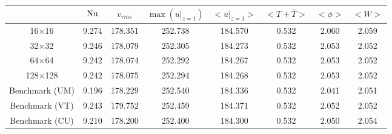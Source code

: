 \begin{tabular}{c|ccccccc}
    & $\mathrm{Nu}$ & $v_{rms}$ & $\max(u|_{z=1})$ & $<u|_{z=1}>$ & $<T + \bar{T}>$ & $<\phi>$ & $<W>$ \\
\hline
16$\times$16 & 9.274 & 178.351 & 252.738 & 184.570 & 0.532 & 2.060 & 2.059 \\
32$\times$32 & 9.246 & 178.079 & 252.305 & 184.273 & 0.532 & 2.053 & 2.052 \\
64$\times$64 & 9.242 & 178.074 & 252.292 & 184.267 & 0.532 & 2.053 & 2.052 \\
128$\times$128 & 9.242 & 178.075 & 252.294 & 184.268 & 0.532 & 2.053 & 2.052 \\
\hline
Benchmark (UM) & 9.196 & 178.229 & 252.540 & 184.336 & 0.532 & 2.041 & 2.051 \\
Benchmark (VT) & 9.243 & 179.752 & 252.459 & 184.371 & 0.532 & 2.052 & 2.052 \\
Benchmark (CU) & 9.210 & 178.200 & 252.400 & 184.300 & 0.532 & 2.050 & 2.054 \\
\end{tabular}
